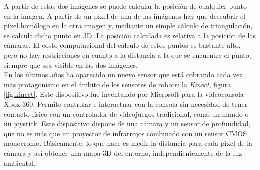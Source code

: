 \begin{figure}[h]
  \centering
\end{figure}

A partir de estas dos imágenes se puede calcular la posición de cualquier punto en la imagen. A partir de un píxel de una de las imágenes hay que descubrir el píxel homólogo en la otra imagen y, mediante un simple cálculo de triangulación, se calcula dicho punto en 3D. La posición calculada es relativa a la posición de las cámaras. El costo computacional del cálculo de estos puntos es bastante alto, pero no hay restricciones en cuanto a la distancia a la que se encuentre el punto, siempre que sea visible en las dos imágenes. \\

En los últimos años ha aparecido un nuevo sensor que está cobrando cada vez más protagonismo en el ámbito de los sensores de robots: la \textit{Kinect}, figura \ref{fig:kinect}. Este dispositivo fue inventando por Microsoft para la videoconsola Xbox 360. Permite controlar e interactuar con la consola sin necesidad de tener contacto físico con un controlador de videojuegos tradicional, como un mando o un joystick. Este dispositivo dispone de una cámara y un sensor de profundidad, que no es más que un proyector de infrarrojos combinado con un sensor CMOS monocromo. Básicamente, lo que hace es medir la distancia para cada píxel de la cámara y así obtener una mapa 3D del entorno, independientemente de la luz ambiental. \\

